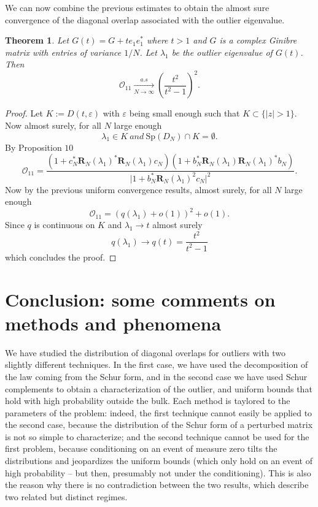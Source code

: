 \documentclass[12pt,a4paper]{amsart}
\theoremstyle{plain} %
\newtheorem{theorem}{Theorem}
\newcommand{\Ov}{\mathscr{O}}
\newcommand{\la}{\lambda}
\begin{document}
     We can now combine the previous estimates to obtain the almost sure convergence of the diagonal overlap associated with the outlier eigenvalue.
\begin{theorem}
    Let $G(t)=G+te_1e_1^*$ where $t>1$ and $G$ is a complex Ginibre matrix with entries of variance $1/N$. Let $\la_1$ be the outlier eigenvalue of $G(t)$. Then 
    \begin{equation*}
        \Ov_{11}\xrightarrow[N\rightarrow\infty]{a.s}\left(\frac{t^2}{t^2-1}\right)^2.
    \end{equation*}
\end{theorem}
\begin{proof}
    Let $K:=D(t,\varepsilon)$ with $\varepsilon$ being small enough such that $K\subset \{\lvert z \lvert >1\}$. Now almost surely, for all $N$ large enough 
    \begin{equation*}
        \la_1 \in K \ \textit{and} \ \mathrm{Sp}(D_N)\cap K=\emptyset.
    \end{equation*}
    By Proposition $10$
    \begin{equation*}
        \Ov_{11}= \frac{(1+c_N^*\mathbf{R}_{N}(\la_1)^*\mathbf{R}_{N}(\la_1)c_N)(1+b_N^*\mathbf{R}_{N}(\la_1)\mathbf{R}_{N}(\la_1)^*b_N)}{\lvert 1 +b_N^*\mathbf{R}_{N}(\la_1)^2c_N\lvert^2}.
    \end{equation*}
    Now by the previous uniform convergence results, almost surely, for all $N$ large enough
    \begin{equation*}
        \Ov_{11}=(q(\la_1)+o(1))^2+o(1).
    \end{equation*}
    Since $q$ is continuous on $K$ and $\la_1 \rightarrow t$ almost surely 
    \begin{equation*}
        q(\la_1)\rightarrow q(t)=\frac{t^2}{t^2-1}
    \end{equation*}
    which concludes the proof.
\end{proof}


\section{Conclusion: some comments on methods and phenomena}\label{sec_conclusion}

We have studied the distribution of diagonal overlaps for outliers with two slightly different techniques. In the first case, we have used the decomposition of the law coming from the Schur form, and in the second case we have used Schur complements to obtain a characterization of the outlier, and uniform bounds that hold with high probability outside the bulk. Each method is taylored to the parameters of the problem: indeed, the first technique cannot easily be applied to the second case, because the distribution of the Schur form of a perturbed matrix is not so simple to characterize; and the second technique cannot be used for the first problem, because conditioning on an event of measure zero tilts the distributions and jeopardizes the uniform bounds (which only hold on an event of high probability -- but then, presumably not under the conditioning).  This is also the reason why there is no contradiction between the two results, which describe two related but distinct regimes. 
\end{document}

